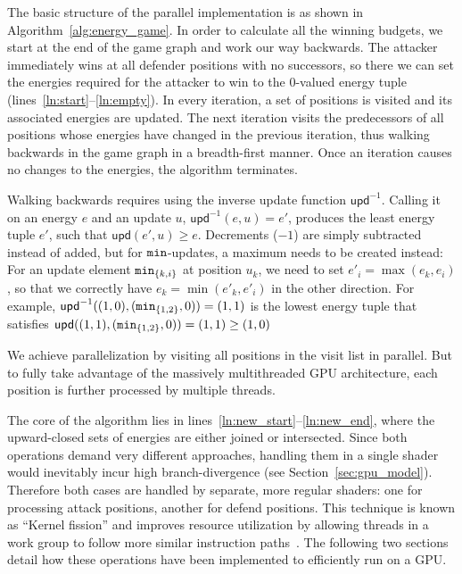 The basic structure of the parallel implementation
is as shown in Algorithm~\ref{alg:energy_game}.
In order to calculate all the winning budgets,
we start at the end of the game graph and work our way backwards.
The attacker immediately wins at all defender positions with no successors,
so there we can set the energies required for the attacker to win to the
0-valued energy tuple (lines~\ref{ln:start}--\ref{ln:empty}).
In every iteration,
a set of positions is visited and its associated energies are updated.
The next iteration visits the predecessors of all positions whose energies
have changed in the previous iteration,
thus walking backwards in the game graph in a breadth-first manner.
Once an iteration causes no changes to the energies, the algorithm terminates.

Walking backwards requires using the inverse update function
$\mathsf{upd}^{-1}$.
Calling it on an energy $e$ and an update $u$, $\mathsf{upd}^{-1}(e, u) = e'$,
produces the least energy tuple $e'$, such that $\mathsf{upd}(e', u) \geq e$.
Decrements ($-1$) are simply subtracted instead of added,
but for $\mathtt{min}$-updates, a maximum needs to be created instead:
For an update element $\mathtt{min}_{\{k, i\}}$ at position $u_k$,
we need to set $e'_i = \max(e_k, e_i)$,
so that we correctly have $e_k = \min(e'_k, e'_i)$ in the other direction.
For example,
$\mathsf{upd}^{-1}((1, 0), (\mathtt{min}_{\{1, 2\}}, 0)) = (1, 1)$
is the lowest energy tuple that satisfies
$\mathsf{upd}((1, 1), (\mathtt{min}_{\{1, 2\}}, 0)) = (1, 1)
    \geq (1, 0)$

We achieve parallelization by visiting all positions in the visit list
in parallel.
But to fully take advantage of the massively multithreaded
GPU architecture, each position is further processed by multiple threads.

The core of the algorithm lies in lines~\ref{ln:new_start}--\ref{ln:new_end},
where the upward-closed sets of energies are either joined or intersected.
Since both operations demand very different approaches,
handling them in a single shader would inevitably incur high branch-divergence
(see Section~\ref{sec:gpu_model}).
Therefore both cases are handled by separate, more regular shaders:
one for processing attack positions, another for defend positions.
This technique is known as \enquote{Kernel fission}
and improves resource utilization by allowing threads in a work group to follow
more similar instruction paths~\cite{Hijma2023}.
The following two sections detail how these operations have been implemented to
efficiently run on a GPU\@.


